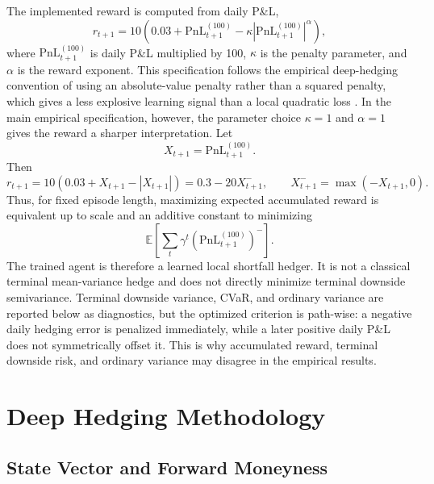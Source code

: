 \documentclass[a4paper,12pt]{article}
\numberwithin{equation}{section}
\begin{document}
The implemented reward is computed from daily P\&L,
\begin{equation}
    r_{t+1}
    =
    10
    \left(
        0.03
        +
        \mathrm{PnL}^{(100)}_{t+1}
        -
        \kappa
        \left|
            \mathrm{PnL}^{(100)}_{t+1}
        \right|^\alpha
    \right),
    \label{eq:reward_step}
\end{equation}
where $\mathrm{PnL}^{(100)}_{t+1}$ is daily P\&L multiplied by 100, $\kappa$ is the penalty parameter, and $\alpha$ is the reward exponent. This specification follows the empirical deep-hedging convention of using an absolute-value penalty rather than a squared penalty, which gives a less explosive learning signal than a local quadratic loss \citep{mikkila2023empirical}. In the main empirical specification, however, the parameter choice $\kappa=1$ and $\alpha=1$ gives the reward a sharper interpretation. Let
\[
    X_{t+1} = \mathrm{PnL}^{(100)}_{t+1}.
\]
Then
\begin{equation}
    r_{t+1}
    =
    10
    \left(
        0.03
        +
        X_{t+1}
        -
        |X_{t+1}|
    \right)
    =
    0.3
    -
    20X_{t+1}^- ,
    \qquad
    X_{t+1}^-=\max(-X_{t+1},0).
    \label{eq:reward_shortfall}
\end{equation}
Thus, for fixed episode length, maximizing expected accumulated reward is equivalent up to scale and an additive constant to minimizing
\begin{equation}
    \mathbb{E}
    \left[
        \sum_{t}
        \gamma^t
        \left(
            \mathrm{PnL}^{(100)}_{t+1}
        \right)^-
    \right].
    \label{eq:daily_shortfall_objective}
\end{equation}
The trained agent is therefore a learned local shortfall hedger. It is not a classical terminal mean-variance hedge and does not directly minimize terminal downside semivariance. Terminal downside variance, CVaR, and ordinary variance are reported below as diagnostics, but the optimized criterion is path-wise: a negative daily hedging error is penalized immediately, while a later positive daily P\&L does not symmetrically offset it. This is why accumulated reward, terminal downside risk, and ordinary variance may disagree in the empirical results.

\section{Deep Hedging Methodology}

\subsection{State Vector and Forward Moneyness}
\end{document}
